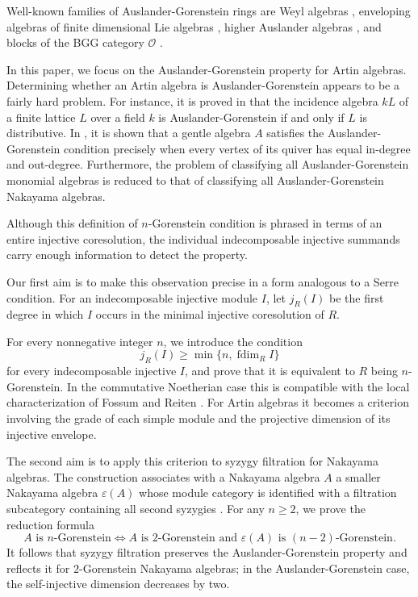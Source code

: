 \documentclass[a4paper,reqno]{amsart}
\numberwithin{equation}{section}
\theoremstyle{plain}
\theoremstyle{definition}
\theoremstyle{remark}
\DeclareMathOperator{\fdim}{fdim}
\renewcommand{\-}{\mbox{-}}
\newcommand{\scO}{\mathcal{O}}
\begin{document}
Well-known families of Auslander-Gorenstein rings are Weyl algebras \cite{Vo00}, 
enveloping algebras of finite dimensional Lie algebras \cite{Vo00},
higher Auslander algebras \cite{Iya07}, 
and blocks of the BGG category \(\scO\) \cite{KMM21}.


In this paper, we focus on the Auslander-Gorenstein property for Artin algebras. 
Determining whether an Artin algebra is Auslander-Gorenstein appears 
to be a fairly hard problem.
For instance, it is proved in \cite{IM22} that the incidence algebra \(kL\) 
of a finite lattice \(L\) 
over a field \(k\) is Auslander-Gorenstein if and only if \(L\) is distributive.
In \cite{Kla25}, it is shown that a gentle algebra \(A\) satisfies the 
Auslander-Gorenstein condition precisely when every vertex of its quiver 
has equal in-degree and out-degree.
Furthermore, the problem of classifying all Auslander-Gorenstein monomial algebras 
is reduced to that of classifying all Auslander-Gorenstein Nakayama algebras.

Although this definition of \(n\)-Gorenstein condition is
phrased in terms of  an entire injective coresolution, 
the individual indecomposable injective summands carry enough information 
to detect the property.


Our first aim is to make this observation precise in a form analogous to a
Serre condition.  
For an indecomposable injective module \(I\), let
\(j_R(I)\) be the first degree in which \(I\) occurs in the minimal injective
coresolution of \(R\).  

For every nonnegative integer \(n\), we introduce the condition
\[
  j_R(I)\geq \min\{n,\fdim_R I\}
\]
for every indecomposable injective \(I\), and prove that it is equivalent to
\(R\) being \(n\)-Gorenstein.  
In the commutative Noetherian case this is
compatible with the local characterization of Fossum and Reiten
\cite{RF72}.  
For Artin algebras it becomes a criterion involving the grade
of each simple module and the projective dimension of its injective
envelope.


The second aim is to apply this criterion to syzygy filtration  for Nakayama
algebras. 
The construction associates with a Nakayama algebra \(A\) a
smaller Nakayama algebra \(\varepsilon(A)\) whose module category is
identified with a filtration subcategory containing all second syzygies \cite{Sen19}.  
For any \(n\geq 2\), we prove the  reduction formula
\[
  A\text{ is }n\text{-Gorenstein} 
  \iff
  A\text{ is }2\text{-Gorenstein and }\varepsilon(A)
  \text{ is }(n-2)\text{-Gorenstein}.
\]
It follows that syzygy filtration preserves the Auslander-Gorenstein property
and reflects it for $2$-Gorenstein Nakayama algebras; in the Auslander-Gorenstein
case, the self-injective dimension decreases by two.
\end{document}
